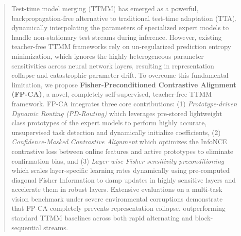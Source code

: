 \documentclass{article}
\theoremstyle{plain}
\theoremstyle{definition}
\theoremstyle{remark}
\begin{document}

\printAffiliationsAndNotice{}

\begin{abstract}
  Test-time model merging (TTMM) has emerged as a powerful, backpropagation-free alternative to traditional test-time adaptation (TTA), dynamically interpolating the parameters of specialized expert models to handle non-stationary test streams during inference. However, existing teacher-free TTMM frameworks rely on un-regularized prediction entropy minimization, which ignores the highly heterogeneous parameter sensitivities across neural network layers, resulting in representation collapse and catastrophic parameter drift. To overcome this fundamental limitation, we propose \textbf{Fisher-Preconditioned Contrastive Alignment (FP-CA)}, a novel, completely self-supervised, teacher-free TTMM framework. FP-CA integrates three core contributions: (1) \textit{Prototype-driven Dynamic Routing (PD-Routing)} which leverages pre-stored lightweight class prototypes of the expert models to perform highly accurate, unsupervised task detection and dynamically initialize coefficients, (2) \textit{Confidence-Masked Contrastive Alignment} which optimizes the InfoNCE contrastive loss between online features and active prototypes to eliminate confirmation bias, and (3) \textit{Layer-wise Fisher sensitivity preconditioning} which scales layer-specific learning rates dynamically using pre-computed diagonal Fisher Information to damp updates in highly sensitive layers and accelerate them in robust layers. Extensive evaluations on a multi-task vision benchmark under severe environmental corruptions demonstrate that FP-CA completely prevents representation collapse, outperforming standard TTMM baselines across both rapid alternating and block-sequential streams.
\end{abstract}
\end{document}
